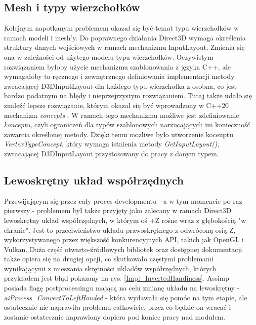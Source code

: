\subsection{Mesh i typy wierzchołków}
Kolejnym napotkanym problemem okazał się być temat typu wierzchołków w ramach modeli i mesh'y. Do poprawnego działania Direct3D wymaga określenia struktury danych wejściowych w ramach mechanizmu InputLayout. Zmienia się ona w zależności od użytego modelu typu wierzchołków. Oczywistym rozwiązaniem byłoby użycie mechanizmu szablonowania z języka C++, ale wymagałoby to ręcznego i zewnętrznego definiowania implementacji metody zwracającej D3DInputLayout dla każdego typu wierzchołka z osobna, co jest bardzo podatnym na błędy i nieprzejrzystym rozwiązaniem. Tutaj także udało się znaleźć lepsze rozwiązanie, którym okazał się być wprowadzony w C++20 mechanizm \textit{concepts} \cite{cpp20:concepts:2025}. W ramach tego mechanizmu możliwe jest zdefiniowanie \textit{konceptu}, czyli ograniczeń dla typów szablonowych narzucających im konieczność zawarcia określonej metody. Dzięki temu możliwe było utworzenie kocenptu \textit{VertexTypeConcept}, który wymaga istnienia metody \textit{GetInputLayout()}, zwracającej D3DInputLayout przystosowany do pracy z danym typem.

\subsection{Lewoskrętny układ współrzędnych}
Przewijającym się przez cały proces developmentu - a w tym momencie po raz pierwszy - problemem był także przyjęty jako zalecany w ramach Direct3D lewoskrętny układ współrzędnych, w którym oś +Z rośne wraz z głębokością "w ekranie". Jest to przeciwieństwo układu prawoskrętnego z odwróconą osią Z, wykorzystywanego przez większość konkurencyjnych API, takich jak OpenGL i Vulkan. Duża część otwarto-źródłowych bibliotek oraz dostępnej dokumentacji także opiera się na drugiej opcji, co skutkowało częstymi problemami wynikającymi z mieszania skrętności układów współrzędnych, których przykładem jest błąd pokazany na rys. \ref{Impl_InvertedHandiness}. Assimp posiada flagę postprocessingu mającą na celu zmianę układu na lewoskrętny - \textit{aiProcess\_ConvertToLeftHanded} - która wydawała się pomóc na tym etapie, ale ostatecznie nie naprawiła problemu całkowicie, przez co będzie on wracać i zostanie ostatecznie naprawiony dopiero pod koniec pracy nad modułem.

